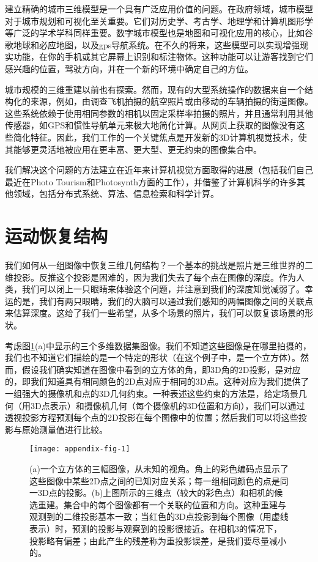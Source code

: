 \begin{translation}
建立精确的城市三维模型是一个具有广泛应用价值的问题。在政府领域，城市模型对于城市规划和可视化至关重要。它们对历史学、考古学、地理学和计算机图形学等广泛的学术学科同样重要。数字城市模型也是地图和可视化应用的核心，比如谷歌地球和必应地图，以及gps导航系统。在不久的将来，这些模型可以实现增强现实功能，在你的手机或其它屏幕上识别和标注物体。这种功能可以让游客找到它们感兴趣的位置，驾驶方向，并在一个新的环境中确定自己的方位。

城市规模的三维重建以前也有探索\cite{antone2002scalable,fruh2004automated,pollefeys2008detailed, zebedin2008fusion}。然而，现有的大型系统操作的数据来自一个结构化的来源，例如，由调查飞机拍摄的航空照片或由移动的车辆拍摄的街道图像。这些系统依赖于使用相同参数的相机以固定采样率拍摄的照片，并且通常利用其他传感器，如GPS和惯性导航单元来极大地简化计算。从网页上获取的图像没有这些简化特征。因此，我们工作的一个关键焦点是开发新的3D计算机视觉技术，使其能够更灵活地被应用在更丰富、更大型、更无约束的图像集合中。

我们解决这个问题的方法建立在近年来计算机视觉方面取得的进展（包括我们自己最近在Photo Tourism\cite{snavely2006photo}和Photosynth方面的工作），并借鉴了计算机科学的许多其他领域，包括分布式系统、算法、信息检索和科学计算。

\section{运动恢复结构}
我们如何从一组图像中恢复三维几何结构？一个基本的挑战是照片是三维世界的二维投影。反推这个投影是困难的，因为我们失去了每个点在图像的深度。作为人类，我们可以闭上一只眼睛来体验这个问题，并注意到我们的深度知觉减弱了。幸运的是，我们有两只眼睛，我们的大脑可以通过我们感知的两幅图像之间的关联点来估算深度。这给了我们一些希望，从多个场景的照片，我们可以恢复该场景的形状。

考虑图\ref{appendix-fig-1}(a)中显示的三个多维数据集图像。我们不知道这些图像是在哪里拍摄的，我们也不知道它们描绘的是一个特定的形状（在这个例子中，是一个立方体）。然而，假设我们确实知道在图像中看到的立方体的角，即3D角的2D投影，是对应的，即我们知道具有相同颜色的2D点对应于相同的3D点。这种对应为我们提供了一组强大的摄像机和点的3D几何约束。一种表述这些约束的方法是，给定场景几何（用3D点表示）和摄像机几何（每个摄像机的3D位置和方向），我们可以通过透视投影方程预测每个点的2D投影在每个图像中的位置；然后我们可以将这些投影与原始测量值进行比较。
\begin{figure}
	\centering
	\texttt{[image: appendix-fig-1]}
	\caption[]{(a)一个立方体的三幅图像，从未知的视角。角上的彩色编码点显示了这些图像中某些2D点之间的已知对应关系；每一组相同颜色的点是同一3D点的投影。(b)上图所示的三维点（较大的彩色点）和相机的候选重建。集合中的每个图像都有一个关联的位置和方向。这种重建与观测到的二维投影基本一致；当红色的3D点投影到每个图像（用虚线表示）时，预测的投影与观察到的投影很接近。在相机3的情况下，投影略有偏差；由此产生的残差称为重投影误差，是我们要尽量减小的。}
	\label{appendix-fig-1}
\end{figure}


\end{translation}
